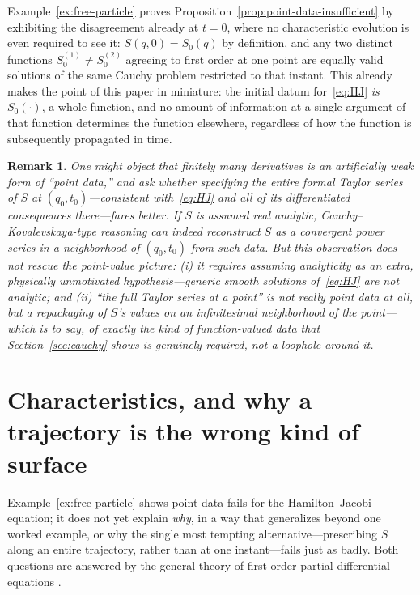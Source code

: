 \documentclass[11pt]{article}
\newtheorem{remark}[proposition]{Remark}
\begin{document}
Example~\ref{ex:free-particle} proves Proposition~\ref{prop:point-data-insufficient} by exhibiting the disagreement already at $t=0$, where no characteristic evolution is even required to see it: $S(q,0)=S_0(q)$ by definition, and any two distinct functions $S_0^{(1)}\neq S_0^{(2)}$ agreeing to first order at one point are equally valid solutions of the same Cauchy problem restricted to that instant. This already makes the point of this paper in miniature: the initial datum for~\eqref{eq:HJ} \emph{is} $S_0(\cdot)$, a whole function, and no amount of information at a single argument of that function determines the function elsewhere, regardless of how the function is subsequently propagated in time.

\begin{remark}
One might object that finitely many derivatives is an artificially weak form of ``point data,'' and ask whether specifying the \emph{entire} formal Taylor series of $S$ at $(q_0,t_0)$---consistent with~\eqref{eq:HJ} and all of its differentiated consequences there---fares better. If $S$ is assumed real analytic, Cauchy--Kovalevskaya-type reasoning can indeed reconstruct $S$ as a convergent power series in a neighborhood of $(q_0,t_0)$ from such data. But this observation does not rescue the point-value picture: (i) it requires assuming analyticity as an extra, physically unmotivated hypothesis---generic smooth solutions of~\eqref{eq:HJ} are not analytic; and (ii) ``the full Taylor series at a point'' is not really point data at all, but a repackaging of $S$'s values on an infinitesimal neighborhood of the point---which is to say, of exactly the kind of function-valued data that Section~\ref{sec:cauchy} shows is genuinely required, not a loophole around it.
\end{remark}

\section{Characteristics, and why a trajectory is the wrong kind of surface}
\label{sec:characteristics}

Example~\ref{ex:free-particle} shows point data fails for the Hamilton--Jacobi equation; it does not yet explain \emph{why}, in a way that generalizes beyond one worked example, or why the single most tempting alternative---prescribing $S$ along an entire trajectory, rather than at one instant---fails just as badly. Both questions are answered by the general theory of first-order partial differential equations \citep{evans2010,courant-hilbert1962}.
\end{document}
